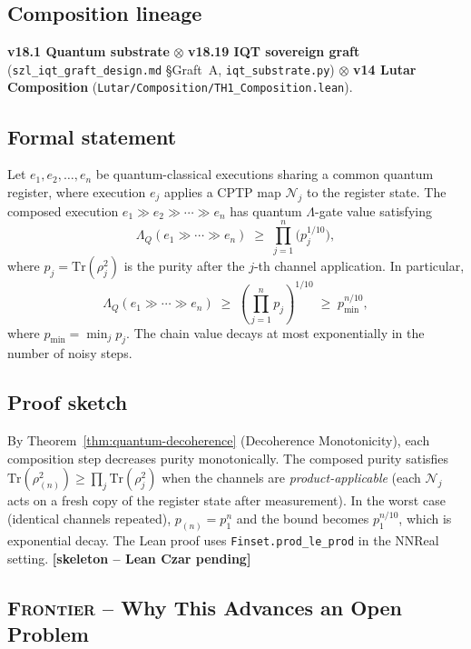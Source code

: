 \subsection*{Composition lineage}
\textbf{v18.1 Quantum substrate} $\otimes$
\textbf{v18.19 IQT sovereign graft}
(\texttt{szl\_iqt\_graft\_design.md} \S{}Graft~A,
\texttt{iqt\_substrate.py}) $\otimes$
\textbf{v14 Lutar Composition}
(\texttt{Lutar/Composition/TH1\_Composition.lean}).

\subsection*{Formal statement}

\begin{theorem}
\label{thm:quantum-chain-bound}
Let $e_1, e_2, \dots, e_n$ be quantum-classical executions sharing a
common quantum register, where execution $e_j$ applies a CPTP map
$\mathcal{N}_j$ to the register state.  The composed execution
$e_1 \gg e_2 \gg \cdots \gg e_n$ has quantum \(\Lambda\)-gate value satisfying
\[
  \Lambda_Q(e_1 \gg \cdots \gg e_n)
  \;\geq\;
  \prod_{j=1}^{n} \bigl(p_j^{1/10}\bigr),
\]
where $p_j = \mathrm{Tr}(\rho_j^2)$ is the purity after the $j$-th
channel application.  In particular,
\[
  \Lambda_Q(e_1 \gg \cdots \gg e_n)
  \;\geq\;
  \left(\prod_{j=1}^{n} p_j\right)^{1/10}
  \;\geq\;
  p_{\min}^{n/10},
\]
where $p_{\min} = \min_j p_j$.  The chain value decays at most
exponentially in the number of noisy steps.
\end{theorem}

\subsection*{Proof sketch}

By Theorem~\ref{thm:quantum-decoherence} (Decoherence Monotonicity),
each composition step decreases purity monotonically.  The composed
purity satisfies $\mathrm{Tr}(\rho_{(n)}^2) \geq
\prod_{j} \mathrm{Tr}(\rho_j^2)$ when the channels are
\emph{product-applicable} (each $\mathcal{N}_j$ acts on a fresh copy
of the register state after measurement).  In the worst case
(identical channels repeated), $p_{(n)} = p_1^n$ and the bound
becomes $p_1^{n/10}$, which is exponential decay.  The Lean proof
uses \texttt{Finset.prod\_le\_prod} in the NNReal setting.
\hfill \textbf{[skeleton -- Lean Czar pending]}

\subsection*{\textsc{Frontier} -- Why This Advances an Open Problem}

